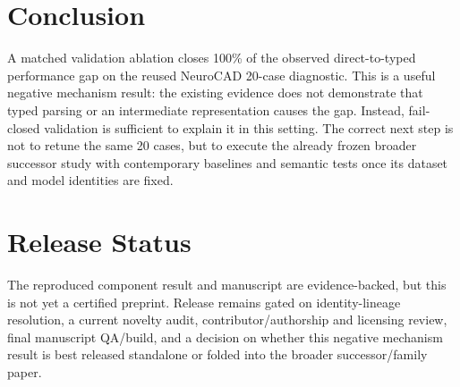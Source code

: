 \documentclass[10pt]{article}
\begin{document}
\section{Conclusion}
A matched validation ablation closes 100\% of the observed direct-to-typed performance gap on the reused NeuroCAD 20-case diagnostic. This is a useful negative mechanism result: the existing evidence does not demonstrate that typed parsing or an intermediate representation causes the gap. Instead, fail-closed validation is sufficient to explain it in this setting. The correct next step is not to retune the same 20 cases, but to execute the already frozen broader successor study with contemporary baselines and semantic tests once its dataset and model identities are fixed.

\section*{Release Status}
The reproduced component result and manuscript are evidence-backed, but this is not yet a certified preprint. Release remains gated on identity-lineage resolution, a current novelty audit, contributor/authorship and licensing review, final manuscript QA/build, and a decision on whether this negative mechanism result is best released standalone or folded into the broader successor/family paper.



\end{document}
